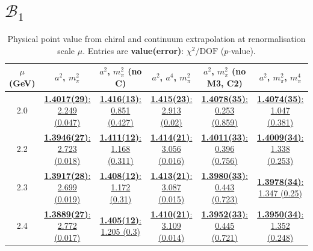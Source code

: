 \documentclass[12pt]{extarticle}
\begin{document}
\clearpage
\section{$\mathcal{B}_1$}
\begin{table}[h!]
\begin{center}
\begin{tabular}{|c|c|c|c|c|c|}
\hline
$\mu$ (GeV) & $a^2$, $m_\pi^2$& $a^2$, $m_\pi^2$ (no C)& $a^2$, $a^4$, $m_\pi^2$& $a^2$, $m_\pi^2$ (no M3, C2)& $a^2$, $m_\pi^2$, $m_\pi^4$\\
\hline
2.0& \hyperlink{VVpAA/SUSY/a2m2_20.pdf.1}{\textbf{1.4017(29)}: 2.249 (0.047)} & \hyperlink{VVpAA/SUSY/a2m2noC_20.pdf.1}{\textbf{1.416(13)}: 0.851 (0.427)} & \hyperlink{VVpAA/SUSY/a2a4m2_20.pdf.1}{\textbf{1.415(23)}: 2.913 (0.02)} & \hyperlink{VVpAA/SUSY/a2m2mcut_20.pdf.1}{\textbf{1.4078(35)}: 0.253 (0.859)} & \hyperlink{VVpAA/SUSY/a2m2m4_20.pdf.1}{\textbf{1.4074(35)}: 1.047 (0.381)}\\
2.2& \hyperlink{VVpAA/SUSY/a2m2_22.pdf.1}{\textbf{1.3946(27)}: 2.723 (0.018)} & \hyperlink{VVpAA/SUSY/a2m2noC_22.pdf.1}{\textbf{1.411(12)}: 1.168 (0.311)} & \hyperlink{VVpAA/SUSY/a2a4m2_22.pdf.1}{\textbf{1.414(21)}: 3.056 (0.016)} & \hyperlink{VVpAA/SUSY/a2m2mcut_22.pdf.1}{\textbf{1.4011(33)}: 0.396 (0.756)} & \hyperlink{VVpAA/SUSY/a2m2m4_22.pdf.1}{\textbf{1.4009(34)}: 1.338 (0.253)}\\
2.3& \hyperlink{VVpAA/SUSY/a2m2_23.pdf.1}{\textbf{1.3917(28)}: 2.699 (0.019)} & \hyperlink{VVpAA/SUSY/a2m2noC_23.pdf.1}{\textbf{1.408(12)}: 1.172 (0.31)} & \hyperlink{VVpAA/SUSY/a2a4m2_23.pdf.1}{\textbf{1.413(21)}: 3.087 (0.015)} & \hyperlink{VVpAA/SUSY/a2m2mcut_23.pdf.1}{\textbf{1.3980(33)}: 0.443 (0.723)} & \hyperlink{VVpAA/SUSY/a2m2m4_23.pdf.1}{\textbf{1.3978(34)}: 1.347 (0.25)}\\
2.4& \hyperlink{VVpAA/SUSY/a2m2_24.pdf.1}{\textbf{1.3889(27)}: 2.772 (0.017)} & \hyperlink{VVpAA/SUSY/a2m2noC_24.pdf.1}{\textbf{1.405(12)}: 1.205 (0.3)} & \hyperlink{VVpAA/SUSY/a2a4m2_24.pdf.1}{\textbf{1.410(21)}: 3.109 (0.014)} & \hyperlink{VVpAA/SUSY/a2m2mcut_24.pdf.1}{\textbf{1.3952(33)}: 0.445 (0.721)} & \hyperlink{VVpAA/SUSY/a2m2m4_24.pdf.1}{\textbf{1.3950(34)}: 1.352 (0.248)}\\
\hline
\end{tabular}
\caption{Physical point value from chiral and continuum extrapolation at renormalisation scale $\mu$. Entries are \textbf{value(error)}: $\chi^2/\text{DOF}$ ($p$-value).}
\end{center}
\end{table}
\end{document}
